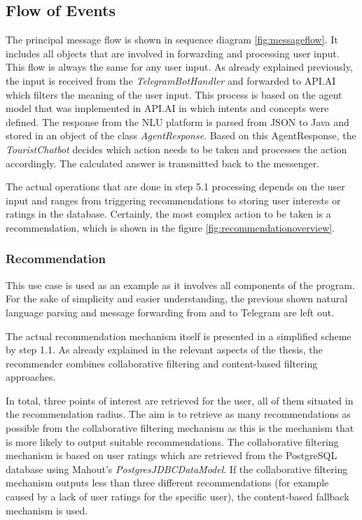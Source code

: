 \subsection{Flow of Events}
The principal message flow is shown in sequence diagram \ref{fig:messageflow}. It includes all objects that are involved in forwarding and processing user input. This flow is always the same for any user input. As already explained previously, the input is received from the \textit{TelegramBotHandler} and forwarded to API.AI which filters the meaning of the user input. This process is based on the agent model that was implemented in API.AI in which intents and concepts were defined. The response from the NLU platform is parsed from JSON to Java and stored in an object of the class \textit{AgentResponse}. Based on this AgentResponse, the \textit{TouristChatbot} decides which action needs to be taken and processes the action accordingly. The calculated answer is transmitted back to the messenger. 


The actual operations that are done in step 5.1 processing depends on the user input and ranges from triggering recommendations to storing user interests or ratings in the database. Certainly, the most complex action to be taken is a recommendation, which is shown in the figure \ref{fig:recommendationoverview}. 

\subsubsection{Recommendation} \label{recommendationmec}
This use case is used as an example as it involves all components of the program.  For the sake of simplicity and easier understanding, the previous shown natural language parsing and message forwarding from and to Telegram are left out.


The actual recommendation mechanism itself is presented in a simplified scheme by step 1.1. As already explained in the relevant aspects of the thesis, the recommender combines collaborative filtering and content-based filtering approaches. 

In total, three points of interest are retrieved for the user, all of them situated in the recommendation radius. The aim is to retrieve as many recommendations as possible from the collaborative filtering mechanism as this is the mechanism that is more likely to output suitable recommendations. The collaborative filtering mechanism is based on user ratings which are retrieved from the PostgreSQL database using Mahout’s  \textit{PostgresJDBCDataModel}.  If the collaborative filtering mechanism outputs less than three different recommendations (for example caused by a lack of user ratings for the specific user), the content-based fallback mechanism is used.

